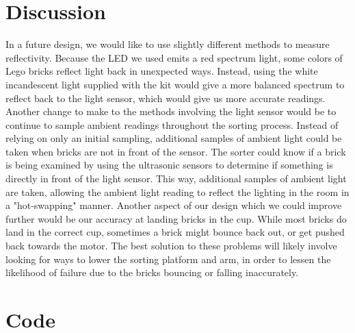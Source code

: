 \documentclass{article}
\begin{document}
\section{Discussion}
In a future design, we would like to use slightly different methods to measure reflectivity.
Because the LED we used emits a red spectrum light, some colors of Lego bricks reflect light back in unexpected ways.
Instead, using the white incandescent light supplied with the kit would give a more balanced spectrum to reflect back to the light sensor, which would give us more accurate readings.
Another change to make to the methods involving the light sensor would be to continue to sample ambient readings throughout the sorting process.
Instead of relying on only an initial sampling, additional samples of ambient light could be taken when bricks are not in front of the sensor.
The sorter could know if a brick is being examined by using the ultrasonic sensors to determine if something is directly in front of the light sensor.
This way, additional samples of ambient light are taken, allowing the ambient light reading to reflect the lighting in the room in a "hot-swapping" manner.
Another aspect of our design which we could improve further would be our accuracy at landing bricks in the cup.
While most bricks do land in the correct cup, sometimes a brick might bounce back out, or get pushed back towards the motor.
The best solution to these problems will likely involve looking for ways to lower the sorting platform and arm, in order to lessen the likelihood of failure due to the bricks bouncing or falling inaccurately.  

\newpage
\appendix
\section{Code}


\end{document}
